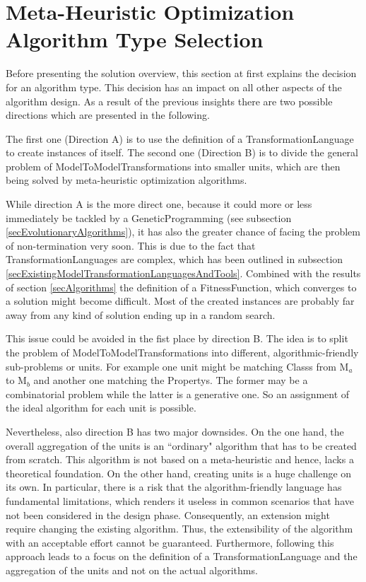 \section{Meta-Heuristic Optimization Algorithm Type Selection}
\label{secAlgorithmTypeSelection}

Before presenting the solution overview, this section at first explains the decision for an algorithm type. This decision has an impact on all other aspects of the algorithm design. As a result of the previous insights there are two possible directions which are presented in the following.

The first one (Direction A) is to use the definition of a \gls{TransformationLanguage} to create instances of itself. The second one (Direction B) is to divide the general problem of \glspl{ModelToModelTransformation} into smaller units, which are then being solved by meta-heuristic optimization algorithms.

While direction A is the more direct one, because it could more or less immediately be tackled by a \gls{GeneticProgramming} (see subsection \ref{secEvolutionaryAlgorithms}), it has also the greater chance of facing the problem of non-termination very soon. This is due to the fact that \glspl{TransformationLanguage} are complex, which has been outlined in subsection \ref{secExistingModelTransformationLanguagesAndTools}. Combined with the results of section \ref{secAlgorithms} the definition of a \gls{FitnessFunction}, which converges to a solution might become difficult. Most of the created instances are probably far away from any kind of solution ending up in a random search.

This issue could be avoided in the fist place by direction B. The idea is to split the problem of \glspl{ModelToModelTransformation} into different, algorithmic-friendly sub-problems or units. For example one unit might be matching \glspl{Class} from M$_a$ to M$_b$ and another one matching the \glspl{Property}. The former may be a combinatorial problem while the latter is a generative one. So an assignment of the ideal algorithm for each unit is possible.

Nevertheless, also direction B has two major downsides. On the one hand, the overall aggregation of the units is an ``ordinary" algorithm that has to be created from scratch. This algorithm is not based on a meta-heuristic and hence, lacks a theoretical foundation. On the other hand, creating units is a huge challenge on its own. In particular, there is a risk that the algorithm-friendly language has fundamental limitations, which renders it useless in common scenarios that have not been considered in the design phase. Consequently, an extension might require changing the existing algorithm. Thus, the extensibility of the algorithm with an acceptable effort cannot be guaranteed. Furthermore, following this approach leads to a focus on the definition of a \gls{TransformationLanguage} and the aggregation of the units and not on the actual algorithms.

